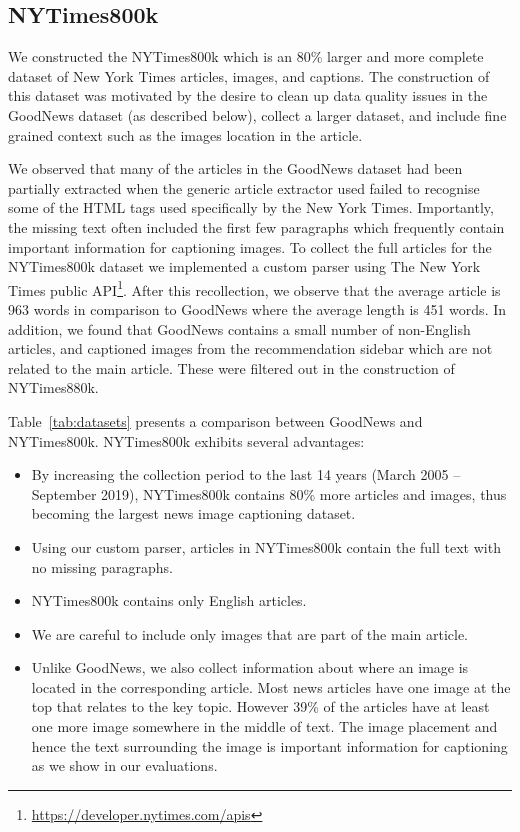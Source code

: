 \subsection{NYTimes800k}
\label{ssec:nytimes800k}

We constructed the NYTimes800k which is an 80\% larger and more complete
dataset
of New York Times articles, images, and captions. The construction of this
dataset was motivated by the desire to clean up data quality issues in the
GoodNews dataset (as described below), collect a larger dataset, and include
fine grained context
such as the images location in the article.

We observed that many of the articles in the GoodNews dataset had
been partially extracted when the generic article extractor used
failed to recognise some of the HTML tags used
specifically by the New York Times. Importantly, the missing text often
included the first few
paragraphs
which frequently contain important information for captioning images. To
collect the full articles for the NYTimes800k dataset we
implemented a custom parser using The New York Times public
API\footnote{\href{https://developer.nytimes.com/apis}{https://developer.nytimes.com/apis}}.
After this recollection, we observe that the average article is 963 words in
comparison to GoodNews where the average length is 451 words. In addition, we
found that GoodNews contains a
small number of non-English articles, and captioned images from the
recommendation sidebar which are not related to the main article. These were
filtered out in the construction of NYTimes880k.


Table~\ref{tab:datasets} presents a comparison between GoodNews and
NYTimes800k. NYTimes800k exhibits several advantages:

\begin{itemize}
   \item By increasing the collection period to the last 14 years (March 2005
   -- September 2019), NYTimes800k contains 80\% more articles and images, thus
   becoming the largest news image captioning dataset.
   \item Using our custom parser, articles in NYTimes800k contain the full text
   with no missing paragraphs.
   \item NYTimes800k contains only English articles.
   \item We are careful to include only images that are part of the main
   article.
   \item Unlike GoodNews, we also collect information about where an image is
   located in the corresponding article. Most news articles have one image at
   the top that relates to the key topic. However 39\% of the articles have at
   least one more image somewhere in the middle of text. The image placement
   and hence the text surrounding the image is important information for
   captioning as we show in our evaluations.
\end{itemize}

